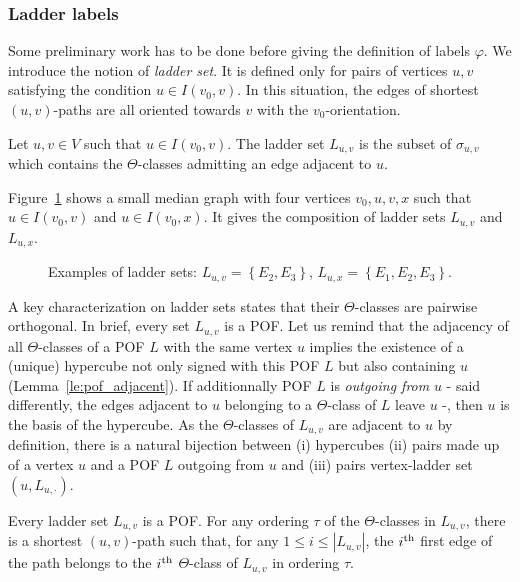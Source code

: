 \documentclass[a4paper,UKenglish,numberwithinsect,cleveref, autoref]{lipics-v2021}
\newcommand{\set}[1]{\left\{ #1 \right\}}
\newcommand{\card}[1]{\left| #1 \right|}
\newcommand{\ith}[1]{#1^{\mbox{\scriptsize{th}}}}
\begin{document}
\subsubsection{Ladder labels} \label{subsubsec:ladder}

Some preliminary work has to be done before giving the definition of labels $\varphi$. We introduce the notion of \textit{ladder set}. It is defined only for pairs of vertices $u,v$ satisfying the condition $u \in I(v_0,v)$. In this situation, the edges of shortest $(u,v)$-paths are all oriented towards $v$ with the $v_0$-orientation.

\begin{definition}
Let $u,v \in V$ such that $u \in I(v_0,v)$. The ladder set $L_{u,v}$ is the subset of $\sigma_{u,v}$ which contains the $\Theta$-classes admitting an edge adjacent to $u$.
\label{def:ladder}
\end{definition}

Figure~\ref{fig:compute_labels} shows a small median graph with four vertices $v_0,u,v,x$ such that $u \in I(v_0,v)$ and $u \in I(v_0,x)$. It gives the composition of ladder sets $L_{u,v}$ and $L_{u,x}$.

\begin{figure}[h]
\centering
\scalebox{0.8}{}
\caption{Examples of ladder sets: $L_{u,v} = \set{E_2,E_3}$, $L_{u,x} = \set{E_1,E_2,E_3}$.}
\label{fig:compute_labels}
\end{figure}

A key characterization on ladder sets states that their $\Theta$-classes are pairwise orthogonal. In brief, every set $L_{u,v}$ is a POF. Let us remind that the adjacency of all $\Theta$-classes of a POF $L$ with the same vertex $u$ implies the existence of a (unique) hypercube not only signed with this POF $L$ but also containing $u$ (Lemma~\ref{le:pof_adjacent}). If additionnally POF $L$ is \textit{outgoing from} $u$ - said differently, the edges adjacent to $u$ belonging to a $\Theta$-class of $L$ leave $u$ -, then $u$ is the basis of the hypercube.  As the $\Theta$-classes of $L_{u,v}$ are adjacent to $u$ by definition, there is a natural bijection between (i) hypercubes (ii) pairs made up of a vertex $u$ and a POF $L$ outgoing from $u$ and (iii) pairs vertex-ladder set $(u,L_{u,\cdot})$.

\begin{lemma}
Every ladder set $L_{u,v}$ is a POF. For any ordering $\tau$ of the $\Theta$-classes in $L_{u,v}$, there is a shortest $(u,v)$-path such that, for any $1\le i \le \card{L_{u,v}}$, the $\ith{i}$ first edge of the path belongs to the $\ith{i}$ $\Theta$-class of $L_{u,v}$ in ordering $\tau$.
\label{le:ladder_POF}
\end{lemma}
\end{document}
